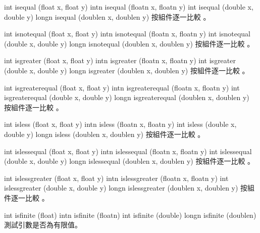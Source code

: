 int isequal (float x, float y)
intn isequal (floatn x, floatn y) 
int isequal (double x, double y)
longn isequal (doublen x, doublen y)
\stopbuffer
{}
按組件逐一比較 。
\stopbuffer

int isnotequal (float x, float y)
intn isnotequal (floatn x, floatn y)
int isnotequal (double x, double y)
longn isnotequal (doublen x, doublen y)
\stopbuffer
{}
按組件逐一比較 。
\stopbuffer

int isgreater (float x, float y)
intn isgreater (floatn x, floatn y)
int isgreater (double x, double y)
longn isgreater (doublen x, doublen y)
\stopbuffer
{}
按組件逐一比較 。
\stopbuffer

int isgreaterequal (float x, float y)
intn isgreaterequal (floatn x, floatn y)
int isgreaterequal (double x,
		double y)
longn isgreaterequal (doublen x,
		doublen y)
\stopbuffer
{}
按組件逐一比較 。
\stopbuffer

int isless (float x, float y)
intn isless (floatn x, floatn y)
int isless (double x, double y)
longn isless (doublen x, doublen y)
\stopbuffer
{}
按組件逐一比較 。
\stopbuffer

int islessequal (float x, float y)
intn islessequal (floatn x, floatn y)
int islessequal (double x, double y)
longn islessequal (doublen x, doublen y)
\stopbuffer
{}
按組件逐一比較 。
\stopbuffer

int islessgreater (float x, float y)
intn islessgreater (floatn x, floatn y)
int islessgreater (double x, double y)
longn islessgreater (doublen x, doublen y)
\stopbuffer
{}
按組件逐一比較 。
\stopbuffer

int isfinite (float)
intn isfinite (floatn)
int isfinite (double)
longn isfinite (doublen)
\stopbuffer
{}
測試引數是否為有限值。
\stopbuffer

